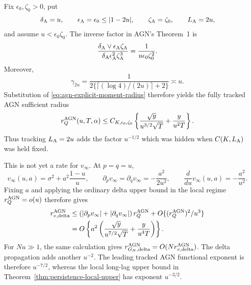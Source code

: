 Fix \(\epsilon_0,\zeta_0>0\), put
\[
 \delta_{\rm A}=u,\qquad
 \epsilon_{\rm A}=\epsilon_0\leq|1-2u|,\qquad
 \zeta_{\rm A}=\zeta_0,\qquad L_{\rm A}=2u,
\]
and assume \(u<\epsilon_0\zeta_0\).  The inverse factor in AGN's
Theorem~1 is
\[
 \frac{\delta_{\rm A}\vee
 \epsilon_{\rm A}\zeta_{\rm A}}
 {\delta_{\rm A}\epsilon_{\rm A}^2\zeta_{\rm A}^3}
 =\frac1{u\epsilon_0\zeta_0^2}.
\]
Moreover,
\begin{equation}
 \gamma_{2u}
 =\frac1{2\{\lceil(\log4)/(2u)\rceil+2\}}
 \asymp u.
 \label{eq:agn-gap-symmetric}
\end{equation}
Substitution of \eqref{eq:agn-explicit-moment-radius} therefore yields the
fully tracked AGN sufficient radius
\begin{equation}
 r_Q^{\rm AGN}(u,T,\alpha)
 \leq C_{K,\epsilon_0,\zeta_0}
 \left\{
 \frac{\sqrt y}{u^{3/2}\sqrt T}
 +\frac{y}{u^2T}
 \right\}.
 \label{eq:agn-u-raw-rate}
\end{equation}
Thus tracking \(L_{\rm A}=2u\) adds the factor \(u^{-1/2}\) which was hidden
when \(C(K,L_{\rm A})\) was held fixed.

This is not yet a rate for \(v_\infty\).  At \(p=q=u\),
\begin{equation}
 v_\infty(u,a)=\sigma^2+a^2\frac{1-u}{u},\qquad
 \partial_pv_\infty=\partial_qv_\infty=-\frac{a^2}{2u^2},
 \qquad
 \frac{d}{du}v_\infty(u,a)=-\frac{a^2}{u^2}.
 \label{eq:agn-u-gradient}
\end{equation}
Fixing \(a\) and applying the ordinary delta upper bound in the local regime
\(r_Q^{\rm AGN}=o(u)\) therefore gives
\begin{align}
 r_{v,\rm delta}^{\rm AGN}
 &\leq
 \left(
 |\partial_pv_\infty|+|\partial_qv_\infty|
 \right)r_Q^{\rm AGN}
 +O\{(r_Q^{\rm AGN})^2/u^3\}
 \nonumber\\
 &=O\left\{
 a^2\left(
 \frac{\sqrt y}{u^{7/2}\sqrt T}
 +\frac{y}{u^4T}
 \right)
 \right\}.
 \label{eq:agn-u-delta-rate}
\end{align}
For \(Nu\gg1\), the same calculation gives
\(r_{G_N,\rm delta}^{\rm AGN}
=O(Nr_{v,\rm delta}^{\rm AGN})\).
The delta propagation adds another \(u^{-2}\).  The leading tracked AGN
functional exponent is therefore \(u^{-7/2}\), whereas the local long-lag
upper bound in Theorem~\ref{thm:persistence-local-upper} has exponent
\(u^{-3/2}\).

